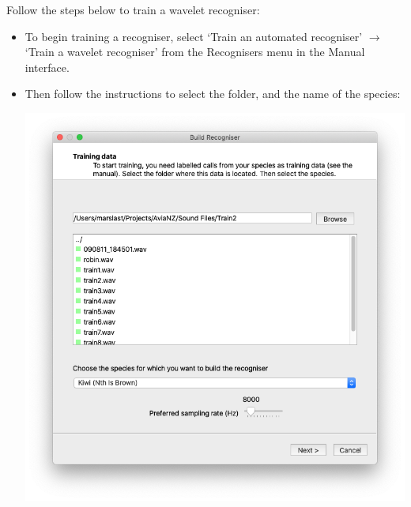 \documentclass{article}
\begin{document}
Follow the steps below to train a wavelet recogniser:
\begin{itemize}
\item To begin training a recogniser, select `Train an automated recogniser' $\rightarrow$ `Train a wavelet recogniser' from the Recognisers menu in the Manual interface. 
\item Then follow the instructions to select the folder, and the name of the species:
\begin{center}
    \includegraphics[width=.8\textwidth]{Figures/BuildRecogniser1}
\end{center}


\end{itemize}
\end{document}
